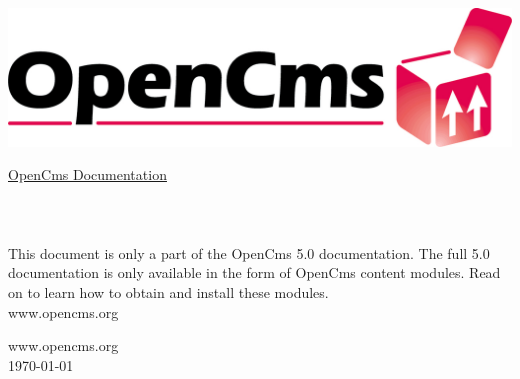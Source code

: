 
\begin{titlepage}
\begin{flushright}
  \includegraphics[width=0.4\linewidth]{pics/logo}
\end{flushright}
\vspace{8cm}
\Huge
\titleFont \underline{OpenCms Documentation}\\
\\
\\
\normalsize
\\
This document is only a part of the OpenCms 5.0 documentation.
The full 5.0 documentation is only available in the form of OpenCms content modules.
Read on to learn how to obtain and install these modules.\\
\vfill
www.opencms.org
\end{titlepage}

\newpage
\thispagestyle{empty}
\vspace*{\fill}
www.opencms.org\\
\today

